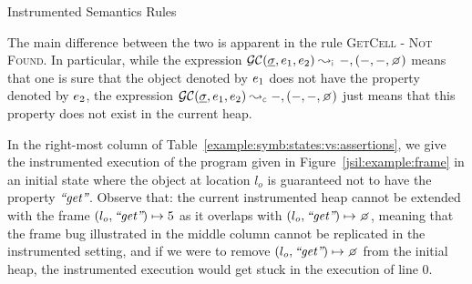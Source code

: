 \begin{display}{Instrumented Semantics Rules}
{{}}
 \end{display}
 
 The main difference between the two is apparent in the rule \textsc{GetCell - Not Found}. 
In particular, while the expression $\absgetcellrule{\instrumented}{\istate, \jsilexpr_1, \jsilexpr_2}{-, (-, -, \none)}$ 
means that one is sure that the object denoted by $e_1$ does not have the property 
denoted by $e_2$, the expression $\absgetcellrule{\concrete}{\istate, \jsilexpr_1, \jsilexpr_2}{-, (-, -, \none)}$ 
just means that this property does not exist in the current heap. 
 
 In the right-most column of Table~\ref{example:symb:states:vs:assertions}, we give the instrumented 
 execution of the program given in Figure~\ref{jsil:example:frame} in an initial state where 
 the object at location $l_o$ is guaranteed not to have the property $\text{{\it ``get''}}$. 
 Observe that:  the current instrumented heap cannot be extended  with 
 the frame $(l_o, \text{{\it ``get''}}) \mapsto 5$ as it overlaps with $(\loc_o, \litstring{get}) \mapsto \none$, meaning 
 that the frame bug illustrated in the middle column cannot be replicated in the instrumented setting,  
 and  if we were to remove $(\loc_o, \litstring{get}) \mapsto \none$ from the initial heap, 
 the instrumented execution would get stuck in the execution of line $0$. 


